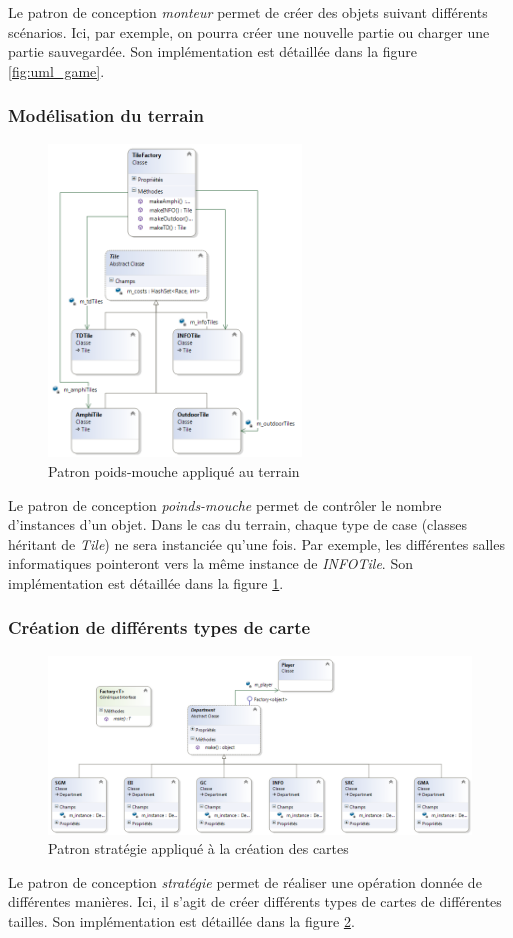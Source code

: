 Le patron de conception \emph{monteur} permet de créer des objets suivant différents scénarios.
Ici, par exemple, on pourra créer une nouvelle partie ou charger une partie sauvegardée.
Son implémentation est détaillée dans la figure \ref{fig:uml_game}.

\subsubsection{Modélisation du terrain} \label{sec:poidsMouche} %

\begin{figure}[!h]
\centering
\includegraphics[width=0.6\textwidth]{Parties/Images/UML_Tiles.png}
\caption{Patron poids-mouche appliqué au terrain}
\label{fig:uml_tiles}
\end{figure}

Le patron de conception \emph{poinds-mouche} permet de contrôler le nombre d'instances d'un objet.
Dans le cas du terrain, chaque type de case (classes héritant de \emph{Tile}) ne sera instanciée qu'une fois.
Par exemple, les différentes salles informatiques pointeront vers la même instance de \emph{INFOTile}.
Son implémentation est détaillée dans la figure \ref{fig:uml_tiles}.

\subsubsection{Création de différents types de carte} \label{sec:strategie} %

\begin{figure}[!h]
\centering
\includegraphics[width=\textwidth]{Parties/Images/UML_Dept.png}
\caption{Patron stratégie appliqué à la création des cartes}
\label{fig:uml_board}
\end{figure}

Le patron de conception \emph{stratégie} permet de réaliser une opération donnée de différentes manières.
Ici, il s'agit de créer différents types de cartes de différentes tailles.
Son implémentation est détaillée dans la figure \ref{fig:uml_board}.
